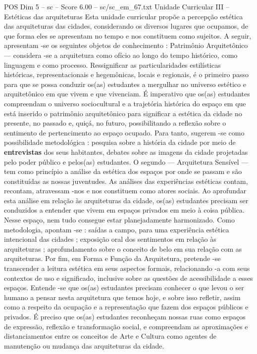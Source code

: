 \begin{textsample}{POS Dim 5 – sc – Score 6.00 – sc/sc\_em\_67.txt}
Unidade Curricular III – Estéticas das arquiteturas Esta unidade curricular propõe a percepção estética das arquiteturas das cidades, considerando os diversos lugares que ocupamos, de que forma eles se apresentam no tempo e nos constituem como sujeitos.
A seguir, apresentam -se os seguintes objetos de conhecimento : Patrimônio Arquitetônico — considera -se a arquitetura como ofício ao longo do tempo histórico, como linguagem e como processo.
Ressignificar as particularidades estilísticas históricas, representacionais e hegemônicas, locais e regionais, é o primeiro passo para que se possa conduzir os(as) estudantes a mergulhar no universo estético e arquitetônico em que vivem e que vivenciam.
É imperativo que os(as) estudantes compreendam o universo sociocultural e a trajetória histórica do espaço em que está inserido o patrimônio arquitetônico para significar a estética da cidade no presente, no passado e, quiçá, no futuro, possibilitando a reflexão sobre o sentimento de pertencimento ao espaço ocupado.
Para tanto, sugerem -se como possibilidade metodológica : pesquisa sobre a história da cidade por meio de \textbf{entrevistas} dos seus habitantes, debates sobre as imagens da cidade projetadas pelo poder público e pelos(as) estudantes.
O segundo — Arquitetura Sensível — tem como princípio a análise da estética dos espaços por onde se passam e são constituídas as nossas juventudes.
As análises das experiências estéticas contam, recontam, atravessam -nos e nos constituem como atores sociais.
Ao aprofundar esta análise em relação às arquiteturas da cidade, os(as) estudantes precisam ser conduzidos a entender que vivem em espaços privados em meio à coisa pública.
Nesse espaço, nem tudo consegue estar planejadamente harmonizado.
Como metodologia, apontam -se : saídas a campo, para uma experiência estética intencional das cidades ; exposição oral dos sentimentos em relação às arquiteturas ; aprofundamento sobre o conceito de belo em sua relação com as arquiteturas.
Por fim, em Forma e Função da Arquitetura, pretende -se transcender a leitura estética em seus aspectos formais, relacionando -a com seus contextos de uso e significado, inclusive sobre as questões de acessibilidade a esses espaços.
Entende -se que os(as) estudantes precisam conhecer o que levou o ser humano a pensar nesta arquitetura que temos hoje, e sobre isso refletir, assim como a respeito da ocupação e a representação que fazem dos espaços públicos e privados.
É preciso que os(as) estudantes reconheçam nossas ruas como espaços de expressão, reflexão e transformação social, e compreendam as aproximações e distanciamentos entre os conceitos de Arte e Cultura como agentes de manutenção ou mudança das arquiteturas da cidade.

\end{textsample}
